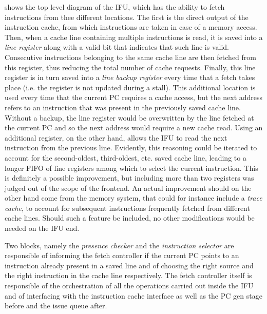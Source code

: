  shows the top level diagram of the \ac{IFU}, which has the ability to fetch instructions from thee different locations. The first is the direct output of the instruction cache, from which instructions are taken in case of a memory access. Then, when a cache line containing multiple instructions is read, it is saved into a \emph{line register} along with a valid bit that indicates that such line is valid. Consecutive instructions belonging to the same cache line are then fetched from this register, thus reducing the total number of cache requests. Finally, this line register is in turn saved into a \emph{line backup register} every time that a fetch takes place (i.e. the register is not updated during a stall). This additional location is used every time that the current \ac{PC} requires a cache access, but the next address refers to an instruction that was present in the previously saved cache line. Without a backup, the line register would be overwritten by the line fetched at the current \ac{PC} and so the next address would require a new cache read. Using an additional register, on the other hand, allows the \ac{IFU} to read the next instruction from the previous line. Evidently, this reasoning could be iterated to account for the second-oldest, third-oldest, etc. saved cache line, leading to a longer \acs{FIFO} of line registers among which to select the current instruction. This is definitely a possible improvement, but including more than two registers was judged out of the scope of the frontend. An actual improvement should on the other hand come from the memory system, that could for instance include a \emph{trace cache}, to account for subsequent instructions frequently fetched from different cache lines. Should such a feature be included, no other modifications would be needed on the \ac{IFU} end.

Two blocks, namely the \emph{presence checker} and the \emph{instruction selector} are responsible of informing the fetch controller if the current \ac{PC} points to an instruction already present in a saved line and of choosing the right source and the right instruction in the cache line respectively. The fetch controller itself is responsible of the orchestration of all the operations carried out inside the \ac{IFU} and of interfacing with the instruction cache interface as well as the \ac{PC} gen stage before and the issue queue after.

